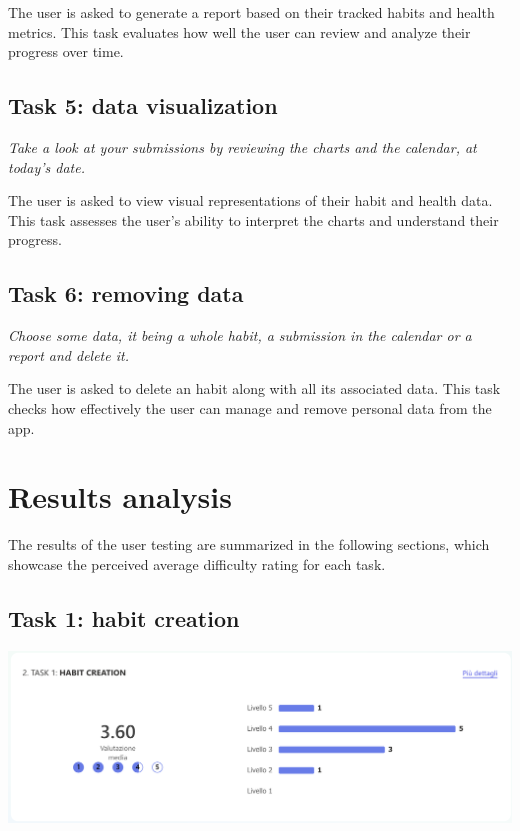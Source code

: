\documentclass{article}
\begin{document}
The user is asked to generate a report based on their tracked habits and health metrics.
This task evaluates how well the user can review and analyze their progress over time.

\subsection{Task 5: data visualization}

\begin{center}
	\textit{
		Take a look at your submissions by reviewing the charts and the calendar, at today's date.
	}
\end{center}

The user is asked to view visual representations of their habit and health data.
This task assesses the user's ability to interpret the charts and understand their progress.

\subsection{Task 6: removing data}

\begin{center}
	\textit{
		Choose some data, it being a whole habit, a submission in the calendar or a report and delete it.
	}
\end{center}

The user is asked to delete an habit along with all its associated data.
This task checks how effectively the user can manage and remove personal data from the app.

\section{Results analysis}

The results of the user testing are summarized in the following sections, which showcase the perceived average difficulty rating for each task.

\subsection{Task 1: habit creation}

\begin{center}
	\includegraphics[width=\linewidth]{images/habit-creation-result.png}
\end{center}
\end{document}
